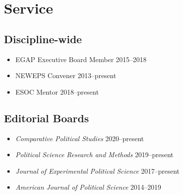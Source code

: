 \documentclass[10pt,a4paper]{article}
\begin{document}
\section{Service}

\subsection*{Discipline-wide}
\begin{itemize}[leftmargin=1em, itemsep=1pt, topsep=2pt, label=\textcolor{secondary}{$\bullet$}]
\item EGAP Executive Board Member \hfill \textcolor{secondary}{2015--2018}
\item NEWEPS Convener \hfill \textcolor{secondary}{2013--present}
\item ESOC Mentor \hfill \textcolor{secondary}{2018--present}
\end{itemize}

\subsection*{Editorial Boards}
\begin{itemize}[leftmargin=1em, itemsep=1pt, topsep=2pt, label=\textcolor{secondary}{$\bullet$}]
\item \textit{Comparative Political Studies} \hfill \textcolor{secondary}{2020--present}
\item \textit{Political Science Research and Methods} \hfill \textcolor{secondary}{2019--present}
\item \textit{Journal of Experimental Political Science} \hfill \textcolor{secondary}{2017--present}
\item \textit{American Journal of Political Science} \hfill \textcolor{secondary}{2014--2019}
\end{itemize}
\end{document}
